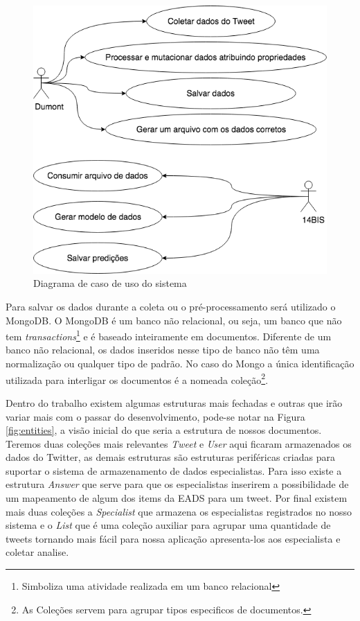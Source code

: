 \begin{figure}[!h]
    \centering
    \includegraphics[width=.5\textwidth]{imagens/tcc_caso_de_uso.png}
    \caption{Diagrama de caso de uso do sistema}
    \label{fig:tcc_caso_de_uso}
\end{figure}

Para salvar os dados durante a coleta ou o pré-processamento será utilizado o MongoDB. O MongoDB  é um banco não relacional, ou seja, um banco que não tem \textit{transactions}\footnote{Simboliza uma atividade realizada em um banco relacional} e é baseado inteiramente em documentos. Diferente de um banco não relacional, os dados inseridos nesse tipo de banco não têm uma normalização ou qualquer tipo de padrão. No caso do Mongo a única identificação utilizada para interligar os documentos é a nomeada coleção\footnote{As Coleções servem para agrupar tipos especificos de documentos.}.

Dentro do trabalho existem algumas estruturas mais fechadas e outras que irão variar mais com o passar do desenvolvimento, pode-se notar na Figura \ref{fig:entities}, a visão inicial do que seria a estrutura de nossos documentos. Teremos duas coleções mais relevantes \textit{Tweet} e \textit{User} aqui ficaram armazenados os dados do Twitter, as demais estruturas são estruturas periféricas criadas para suportar o sistema de armazenamento de dados especialistas. Para isso existe a estrutura \textit{Answer} que serve para que os especialistas inserirem a possibilidade de um mapeamento de algum dos items da EADS para um tweet. Por final existem mais duas coleções a \textit{Specialist} que armazena os especialistas registrados no nosso sistema e o \textit{List} que é uma coleção auxiliar para agrupar uma quantidade de tweets tornando mais fácil para nossa aplicação apresenta-los aos especialista e coletar analise.

